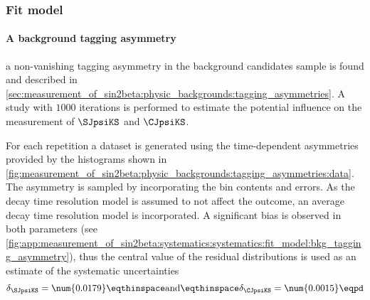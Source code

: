 \subsubsection{Fit model}
\label{sec:measurement_of_sin2beta:systematics:systematics:fit_model}

\paragraph{A background tagging asymmetry} \ie a non-vanishing tagging
asymmetry in the background candidates sample is found and described in
\cref{sec:measurement_of_sin2beta:physic_backgrounds:tagging_asymmetries}. A
\ToyMC study with $\num{1000}$ iterations is performed to estimate the potential
influence on the measurement of $\SJpsiKS$ and $\CJpsiKS$. 

For each repetition a dataset is generated using the time-dependent asymmetries
provided by the histograms shown in
\cref{fig:measurement_of_sin2beta:physic_backgrounds:tagging_asymmetries:data}.
The asymmetry is sampled by incorporating the bin contents and errors. As the
decay time resolution model is assumed to not affect the outcome, an average
decay time resolution model is incorporated. A significant bias is observed in
both \CP parameters (see 
\cref{fig:app:measurement_of_sin2beta:systematics:systematics:fit_model:bkg_tagging_asymmetry}), 
thus the central value of the residual distributions is used as an estimate of
the systematic uncertainties
%
\begin{equation}
  \delta_{\SJpsiKS} = \num{0.0179}\eqthinspace\text{and}\eqthinspace\delta_{\CJpsiKS} = \num{0.0015}\eqpd
\end{equation}


